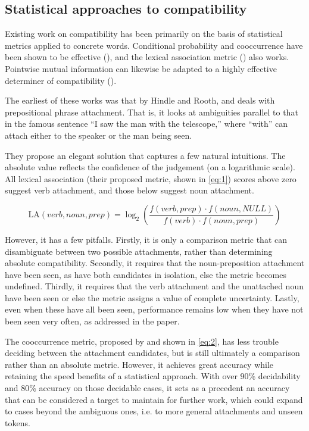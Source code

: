 \documentclass[a4paper, 12pt]{article}
\begin{document}
\subsection{Statistical approaches to compatibility}

Existing work on compatibility has been primarily on the basis of statistical metrics applied to concrete words. Conditional probability and cooccurrence have been shown to be effective (\cite{Volk}), and the lexical association metric (\cite{HindleRooth}) also works. Pointwise mutual information can likewise be adapted to a highly effective determiner of compatibility (\cite{vanNoord}).

The earliest of these works was that by Hindle and Rooth, and deals with prepositional phrase attachment. That is, it looks at ambiguities parallel to that in the famous sentence ``I saw the man with the telescope,'' where ``with'' can attach either to the speaker or the man being seen.

They propose an elegant solution that captures a few natural intuitions. The absolute value reflects the confidence of the judgement (on a logarithmic scale). All lexical association (their proposed metric, shown in \ref{eq:1}) scores above zero suggest verb attachment, and those below suggest noun attachment.

\begin{equation} \label{eq:1}
	\mbox{LA}(verb, noun, prep) = \log_{2} \left( \frac{f(verb, prep) \cdot f(noun, NULL)}{f(verb) \cdot f(noun, prep)} \right)
\end{equation}

However, it has a few pitfalls. Firstly, it is only a comparison metric that can disambiguate between two possible attachments, rather than determining absolute compatibility. Secondly, it requires that the noun-preposition attachment have been seen, as have both candidates in isolation, else the metric becomes undefined. Thirdly, it requires that the verb attachment and the unattached noun have been seen or else the metric assigns a value of complete uncertainty. Lastly, even when these have all been seen, performance remains low when they have not been seen very often, as addressed in the paper.

The cooccurrence metric, proposed by \cite{Volk} and shown in \ref{eq:2}, has less trouble deciding between the attachment candidates, but is still ultimately a comparison rather than an absolute metric. However, it achieves great accuracy while retaining the speed benefits of a statistical approach. With over 90\% decidability and 80\% accuracy on those decidable cases, it sets as a precedent an accuracy that can be considered a target to maintain for further work, which could expand to cases beyond the ambiguous ones, i.e. to more general attachments and unseen tokens.
\end{document}
